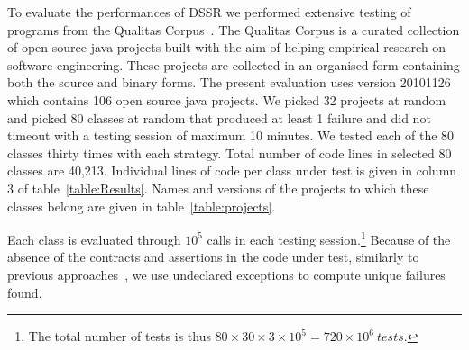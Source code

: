 \documentclass{acm_proc_article-sp}
\begin{document}
To evaluate the performances of DSSR we performed extensive testing of programs from the Qualitas Corpus~\cite{Tempero2010a}. The Qualitas Corpus is a curated collection of open source java projects built with the aim of helping empirical research on  software engineering. These projects are collected in an organised form containing both the source and binary forms. The present evaluation uses version 20101126 which contains 106 open source java projects. We picked 32 projects at random and picked 80 classes at random that produced at least 1 failure and did not timeout with a testing session of maximum 10 minutes. We tested each of the 80 classes thirty times with each strategy. Total number of code lines in selected 80 classes are 40,213. Individual lines of code per class under test is given in column 3 of table~\ref{table:Results}. Names and versions of the projects to which these classes belong are given in table~\ref{table:projects}.

Each class is evaluated through $10^5$ calls in each testing session.\footnote{The total number of tests is thus $80\times 30\times 3 \times 10^5 = 720\times 10^6~tests$.} 
Because of the absence of the contracts and assertions in the code under test, similarly to previous approaches~\cite{Oriol2012}, we use undeclared exceptions to compute unique failures found.
\end{document}
